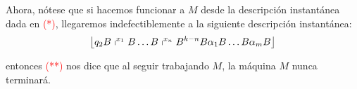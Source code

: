 \begin{frame}
  \begin{block}{}
    \PN Ahora, nótese que si hacemos funcionar a $M$ desde la descripción instantánea dada en \textcolor{red}{(*)},
    llegaremos indefectiblemente a la siguiente descripción instantánea:
    \begin{equation*}
      \left\lfloor q_{2} B \shortmid^{x_{1}} B \dotsc B \shortmid^{x_{n}} B^{k-n}B \alpha_{1} B \dotsc B \alpha_{m} B
      \right\rfloor
    \end{equation*}

    \PN entonces \textcolor{red}{(**)} nos dice que al seguir trabajando $M$, la máquina $M$ nunca terminará.
  \end{block}
\end{frame}
